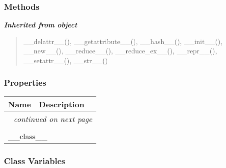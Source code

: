 
  \subsubsection{Methods}


\large{\textbf{\textit{Inherited from object}}}

\begin{quote}
\_\_delattr\_\_(), \_\_getattribute\_\_(), \_\_hash\_\_(), \_\_init\_\_(), \_\_new\_\_(), \_\_reduce\_\_(), \_\_reduce\_ex\_\_(), \_\_repr\_\_(), \_\_setattr\_\_(), \_\_str\_\_()
\end{quote}


  \subsubsection{Properties}

    \vspace{-1cm}
\hspace{\varindent}\begin{longtable}{|p{\varnamewidth}|p{\vardescrwidth}|l}
\cline{1-2}
\cline{1-2} \centering \textbf{Name} & \centering \textbf{Description}& \\
\cline{1-2}
\endhead\cline{1-2}\multicolumn{3}{r}{\small\textit{continued on next page}}\\\endfoot\cline{1-2}
\endlastfoot\multicolumn{2}{|l|}{\textit{Inherited from object}}\\
\multicolumn{2}{|p{\varwidth}|}{\raggedright \_\_class\_\_}\\
\cline{1-2}
\end{longtable}



  \subsubsection{Class Variables}

